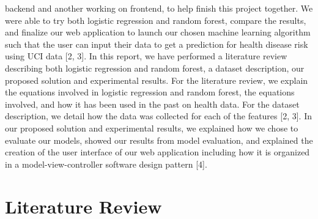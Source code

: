 \documentclass[12pt]{article}
\begin{document}
backend and another working on frontend, to help finish this project 
together. We were able to try both logistic regression and random forest, 
compare the results, and finalize our web application to launch our chosen 
machine learning algorithm such that the user can input their data to get 
a prediction for health disease risk using UCI data [2, 3].
In this report, we have performed a literature review describing both 
logistic regression and random forest, a dataset description, our 
proposed solution and experimental results. For the literature review, 
we explain the equations involved in logistic regression and random forest,
the equations involved, and how it has been used in the past on health 
data. For the dataset description, we detail how the data was collected 
for each of the features [2, 3]. In our proposed solution and experimental 
results, we explained how we chose to evaluate our models, showed our 
results from model evaluation, and explained the creation of the user 
interface of our web application including how it is organized in a 
model-view-controller software design pattern [4].

\newpage
\section*{Literature Review}
\end{document}

